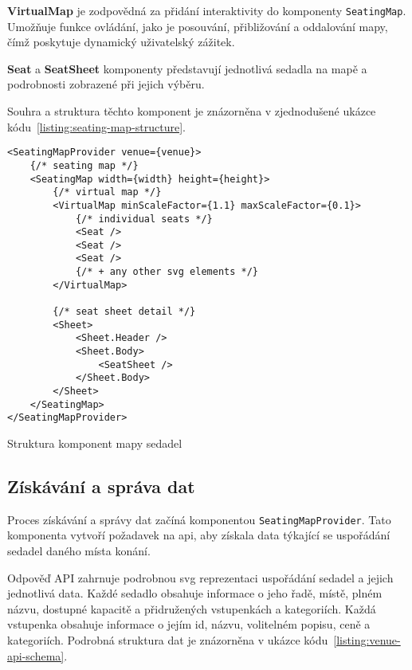 \textbf{VirtualMap} je zodpovědná za přidání interaktivity do komponenty \texttt{SeatingMap}.
Umožňuje funkce ovládání, jako je posouvání, přibližování a oddalování mapy, čímž poskytuje dynamický uživatelský zážitek.

\textbf{Seat} a \textbf{SeatSheet} komponenty představují jednotlivá sedadla na mapě a podrobnosti zobrazené při jejich výběru.

Souhra a struktura těchto komponent je znázorněna v zjednodušené ukázce kódu~\ref{listing:seating-map-structure}.

\begin{listing}[!h]
\begin{verbatim}
<SeatingMapProvider venue={venue}>
	{/* seating map */}
	<SeatingMap width={width} height={height}>
		{/* virtual map */}
		<VirtualMap minScaleFactor={1.1} maxScaleFactor={0.1}>
			{/* individual seats */}
			<Seat />
			<Seat />
			<Seat />
			{/* + any other svg elements */}
		</VirtualMap>

		{/* seat sheet detail */}
		<Sheet>
			<Sheet.Header />
			<Sheet.Body>
				<SeatSheet />
			</Sheet.Body>
		</Sheet>
	</SeatingMap>
</SeatingMapProvider>
\end{verbatim}
\caption{Struktura komponent mapy sedadel}
\label{listing:seating-map-structure}
\end{listing}

\subsection{Získávání a správa dat}
\label{subsec:implementace-seating-data}
Proces získávání a správy dat začíná komponentou \texttt{SeatingMapProvider}.
Tato komponenta vytvoří požadavek na \ac{api}, aby získala data týkající se uspořádání sedadel daného místa konání.

Odpověď API zahrnuje podrobnou \ac{svg} reprezentaci uspořádání sedadel a jejich jednotlivá data.
Každé sedadlo obsahuje informace o jeho řadě, místě, plném názvu, dostupné kapacitě a přidružených vstupenkách a kategoriích.
Každá vstupenka obsahuje informace o jejím id, názvu, volitelném popisu, ceně a kategoriích.
Podrobná struktura dat je znázorněna v ukázce kódu~\ref{listing:venue-api-schema}.

